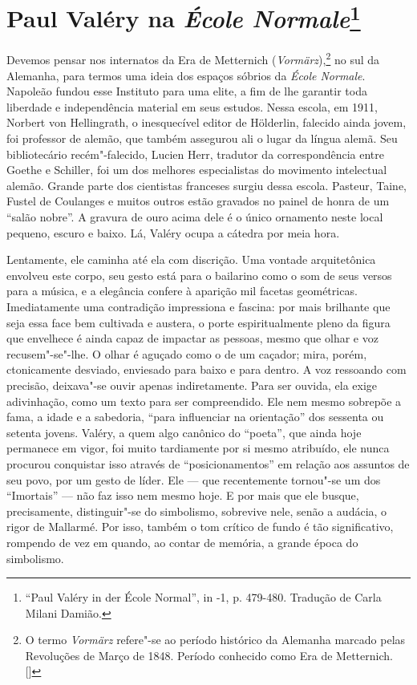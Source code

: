 \chapter{Paul Valéry na \emph{École Normale}\footnote[*]{``Paul Valéry in der École Normal'', in -1, p. 479-480. Tradução de Carla Milani Damião.}}

Devemos pensar nos internatos da Era de Metternich
(\emph{Vormärz}),\footnote{O termo \emph{Vormärz} refere"-se ao período
  histórico da Alemanha marcado pelas Revoluções de Março de 1848.
  Período conhecido como Era de Metternich. []} no sul da
Alemanha, para termos uma ideia dos espaços sóbrios da \emph{École
Normale}. Napoleão fundou esse Instituto para uma elite, a fim de lhe
garantir toda liberdade e independência material em seus estudos. Nessa
escola, em 1911, Norbert von Hellingrath, o inesquecível editor de
Hölderlin, falecido ainda jovem, foi professor de alemão, que também
assegurou ali o lugar da língua alemã. Seu bibliotecário recém"-falecido,
Lucien Herr, tradutor da correspondência entre Goethe e Schiller, foi um
dos melhores especialistas do movimento intelectual alemão. Grande parte
dos cientistas franceses surgiu dessa escola. Pasteur, Taine, Fustel de
Coulanges e muitos outros estão gravados no painel de honra de um
``salão nobre''. A gravura de ouro acima dele é o único ornamento neste local
pequeno, escuro e baixo. Lá, Valéry ocupa a cátedra por meia
hora.

Lentamente, ele caminha até ela com discrição. Uma vontade
arquitetônica envolveu este corpo, seu gesto está para o bailarino como
o som de seus versos para a música, e a elegância confere à aparição mil
facetas geométricas. Imediatamente uma contradição impressiona e
fascina: por mais brilhante que seja essa face bem cultivada e austera,
o porte espiritualmente pleno da figura que envelhece é ainda capaz de
impactar as pessoas, mesmo que olhar e voz recusem"-se"-lhe. O olhar é
aguçado como o de um caçador; mira, porém, ctonicamente desviado, enviesado
para baixo e para dentro. A voz ressoando com precisão, deixava"-se ouvir apenas
indiretamente. Para ser ouvida, ela exige adivinhação, como um texto
para ser compreendido. Ele nem mesmo sobrepõe a fama, a idade e a sabedoria,
``para influenciar na orientação'' dos sessenta ou setenta jovens.
Valéry, a quem algo canônico do ``poeta'', que ainda hoje permanece em
vigor, foi muito tardiamente por si mesmo atribuído, ele nunca
procurou conquistar isso através de ``posicionamentos'' em relação aos
assuntos de seu povo, por um gesto de líder. Ele --- que recentemente
tornou"-se um dos ``Imortais'' --- não faz isso nem mesmo hoje. E por mais
que ele busque, precisamente, distinguir"-se do simbolismo, sobrevive nele, senão a audácia, o rigor de
Mallarmé. Por isso, também o
tom crítico de fundo é tão significativo, rompendo de vez em quando, ao
contar de memória, a grande época do simbolismo.

